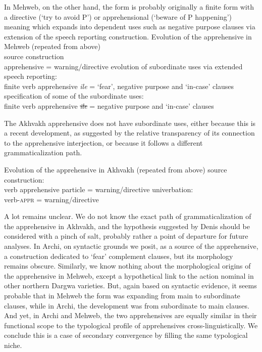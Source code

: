 \documentclass[output=paper,colorlinks,citecolor=brown]{langscibook}
\begin{document}
 In Mehweb, on the other hand, the form is probably originally a finite form with a directive (`try to avoid P') or apprehensional (`beware of P happening') meaning which expands into dependent uses such as negative purpose clauses via extension of the speech reporting construction.
 \newpage
\ea \label{ex:DD80} \textnormal{Evolution of the apprehensive in Mehweb (repeated from  above)} \\
\ea \label{ex:DD80a} \textnormal{source construction} \\
\textnormal{{\ob}apprehensive{\cb} = warning/directive}
\ex \textnormal{evolution of subordinate uses via extended speech reporting:} \\
\textnormal{{\ob}finite verb {\ob}apprehensive{\cb} \textit{ile}{\cb}  = `fear', negative purpose and `in-case' clauses}
\ex \textnormal{specification of some of the subordinate uses:} \\
\textnormal{{\ob}finite verb {\ob}apprehensive{\cb} \sout{\textit{ile}}{\cb}  = negative purpose and `in-case' clauses}
\z
\z
 
The Akhvakh apprehensive does not have subordinate uses, either because this is a recent development, as suggested by the relative transparency of its connection to the apprehensive interjection, or because it follows a different grammaticalization path. 



\ea \label{ex:DD81} \textnormal{Evolution of the apprehensive in Akhvakh (repeated from  above)}
\ea \label{ex:DD82a} \textnormal{source construction:} \\
\textnormal{{\ob}verb apprehensive particle{\cb} = warning/directive}
\ex \label{ex:DD83b} \textnormal{univerbation:} \\
\textnormal{{\ob}verb-\textsc{appr}{\cb} = warning/directive}
\z
\z


 A lot remains unclear. We do not know the exact path of grammaticalization of the apprehensive in Akhvakh, and the hypothesis suggested by Denis \citeauthor{Creisselsunpublished2} should be considered with a pinch of salt, probably rather a point of departure for future analyses. In Archi, on syntactic grounds we posit, as a source of the apprehensive, a construction dedicated to `fear' complement clauses, but its morphology remains obscure. Similarly, we know nothing about the morphological origins of the apprehensive in Mehweb, except a hypothetical link to the action nominal in other northern Dargwa varieties. But, again based on syntactic evidence, it seems probable that in Mehweb the form was expanding from main to subordinate clauses, while in Archi, the development was from subordinate to main clauses. And yet, in Archi and Mehweb, the two apprehensives are equally similar in their functional scope to the typological profile of apprehensives cross-linguistically. We conclude this is a case of secondary convergence by filling the same typological niche.  
\end{document}
